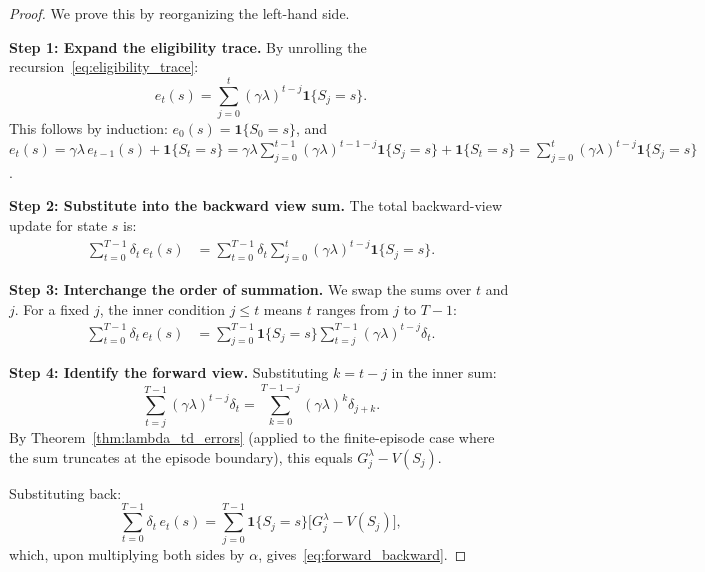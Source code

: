 \documentclass[11pt,a4paper]{article}
\theoremstyle{definition}
\theoremstyle{plain}
\theoremstyle{remark}
\newcommand{\indicator}{\mathbf{1}}
\begin{document}
\begin{proof}
We prove this by reorganizing the left-hand side.

\textbf{Step 1: Expand the eligibility trace.} By unrolling the recursion~\eqref{eq:eligibility_trace}:
\begin{equation}
    e_t(s) = \sum_{j=0}^{t} (\gamma\lambda)^{t-j} \indicator\{S_j = s\}.
    \label{eq:trace_unrolled}
\end{equation}
This follows by induction: $e_0(s) = \indicator\{S_0 = s\}$, and $e_t(s) = \gamma\lambda\, e_{t-1}(s) + \indicator\{S_t = s\} = \gamma\lambda \sum_{j=0}^{t-1}(\gamma\lambda)^{t-1-j}\indicator\{S_j=s\} + \indicator\{S_t=s\} = \sum_{j=0}^{t}(\gamma\lambda)^{t-j}\indicator\{S_j=s\}$.

\textbf{Step 2: Substitute into the backward view sum.} The total backward-view update for state $s$ is:
\begin{align}
    \sum_{t=0}^{T-1} \delta_t\, e_t(s)
    &= \sum_{t=0}^{T-1} \delta_t \sum_{j=0}^{t} (\gamma\lambda)^{t-j} \indicator\{S_j = s\}. \label{eq:fb_step2}
\end{align}

\textbf{Step 3: Interchange the order of summation.} We swap the sums over $t$ and $j$. For a fixed $j$, the inner condition $j \leq t$ means $t$ ranges from $j$ to $T-1$:
\begin{align}
    \sum_{t=0}^{T-1} \delta_t\, e_t(s)
    &= \sum_{j=0}^{T-1} \indicator\{S_j = s\} \sum_{t=j}^{T-1} (\gamma\lambda)^{t-j} \delta_t. \label{eq:fb_step3}
\end{align}

\textbf{Step 4: Identify the forward view.} Substituting $k = t - j$ in the inner sum:
\begin{equation}
    \sum_{t=j}^{T-1} (\gamma\lambda)^{t-j} \delta_t = \sum_{k=0}^{T-1-j} (\gamma\lambda)^k \delta_{j+k}.
    \label{eq:fb_step4}
\end{equation}
By Theorem~\ref{thm:lambda_td_errors} (applied to the finite-episode case where the sum truncates at the episode boundary), this equals $G_j^\lambda - V(S_j)$.

Substituting back:
\begin{equation}
    \sum_{t=0}^{T-1} \delta_t\, e_t(s) = \sum_{j=0}^{T-1} \indicator\{S_j = s\}\bigl[G_j^\lambda - V(S_j)\bigr],
    \label{eq:fb_final}
\end{equation}
which, upon multiplying both sides by $\alpha$, gives~\eqref{eq:forward_backward}.
\end{proof}
\end{document}
